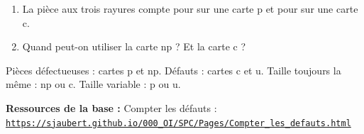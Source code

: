 \documentclass[10pt,a4paper]{article}
\begin{document}
\begin{enumerate}[label=\textcolor{cyan}{\textbf{Q\arabic*.}},leftmargin=22pt]
\item La pièce aux trois rayures compte pour \champ{8mm} sur une carte p et pour \champ{8mm} sur une carte c.\par\vspace{5pt}
\item Quand peut-on utiliser la carte np ? Et la carte c ?\reponse[2]
\end{enumerate}
\begin{tcolorbox}[retenir]Pièces défectueuses : cartes p et np. Défauts : cartes c et u. Taille toujours la même : np ou c. Taille variable : p ou u.\end{tcolorbox}
\vfill{\footnotesize\color{uimm}\textbf{Ressources de la base :} Compter les défauts : \href{https://sjaubert.github.io/000_OI/SPC/Pages/Compter_les_defauts.html}{\nolinkurl{https://sjaubert.github.io/000_OI/SPC/Pages/Compter_les_defauts.html}}}
\end{document}
